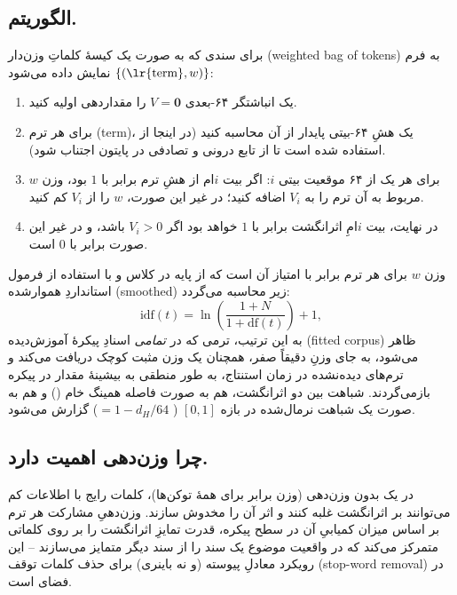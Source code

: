 \documentclass[11pt,a4paper]{article}
\begin{document}
	\subsection{الگوریتم.} برای سندی که به صورت یک کیسهٔ کلماتِ وزن‌دار (weighted bag of tokens) به فرم $\{(\text{\lr{term}}, w)\}$ نمایش داده می‌شود:
	\begin{enumerate}[label=\arabic*.]
		\item یک انباشتگر ۶۴-بعدی $V = \mathbf{0}$ را مقداردهی اولیه کنید.
		\item برای هر ترم (term)، یک هشِ ۶۴-بیتی پایدار از آن محاسبه کنید (در اینجا از  استفاده شده است تا از تابع درونی و تصادفی  در پایتون اجتناب شود).
		\item برای هر یک از ۶۴ موقعیت بیتی $i$: اگر بیت $i$ام از هشِ ترم برابر با $1$ بود، وزن $w$ مربوط به آن ترم را به $V_i$ اضافه کنید؛ در غیر این صورت، $w$ را از $V_i$ کم کنید.
		\item در نهایت، بیت $i$امِ اثرانگشت برابر با $1$ خواهد بود اگر $V_i > 0$ باشد، و در غیر این صورت برابر با $0$ است.
	\end{enumerate}
	وزن $w$ برای هر ترم برابر با امتیاز  آن است که از پایه در کلاس  و با استفاده از فرمول استانداردِ هموارشده (smoothed) زیر محاسبه می‌گردد:
	$$
	\mathrm{idf}(t) = \ln\!\left(\frac{1+N}{1+\mathrm{df}(t)}\right) + 1,
	$$
	به این ترتیب، ترمی که در \emph{تمامی} اسنادِ پیکرهٔ آموزش‌دیده (fitted corpus) ظاهر می‌شود، به جای وزنِ دقیقاً صفر، همچنان یک وزن مثبت کوچک دریافت می‌کند و ترم‌های دیده‌نشده در زمان استنتاج، به طور منطقی به بیشینهٔ مقدار  در پیکره بازمی‌گردند. شباهت بین دو اثرانگشت، هم به صورت فاصله همینگ خام () و هم به صورت یک شباهت نرمال‌شده در بازه $[0,1]$ ( $= 1 - d_H / 64$) گزارش می‌شود.
	
	\subsection{چرا وزن‌دهی  اهمیت دارد.} در یک  بدون وزن‌دهی (وزن برابر برای همهٔ توکن‌ها)، کلمات رایج با اطلاعات کم می‌توانند بر اثرانگشت غلبه کنند و اثر آن را مخدوش سازند. وزن‌دهیِ مشارکت هر ترم بر اساس میزان کمیابیِ آن در سطح پیکره، قدرت تمایزِ اثرانگشت را بر روی کلماتی متمرکز می‌کند که در واقعیت موضوع یک سند را از سند دیگر متمایز می‌سازند -- این رویکرد معادلِ پیوسته (و نه باینری) برای حذف کلمات توقف (stop-word removal) در فضای  است.
	
\end{document}
